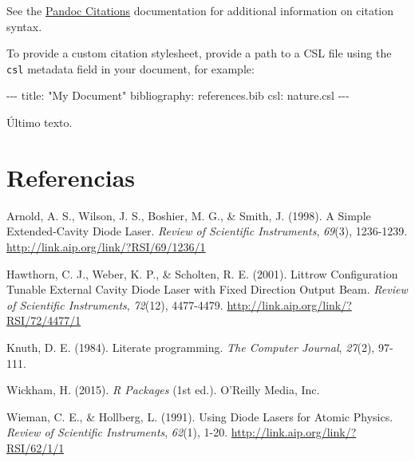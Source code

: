 \documentclass[
  letterpaper,
  12pt,
  oneside,
  spanish,
  doublespacing,
  headsepline,
  parskip]{MastersDoctoralThesis}
\newenvironment{Shaded}{\begin{snugshade}}{\end{snugshade}}
\newcommand{\AttributeTok}[1]{\textcolor[rgb]{0.40,0.45,0.13}{#1}}
\newcommand{\FunctionTok}[1]{\textcolor[rgb]{0.28,0.35,0.67}{#1}}
\newcommand{\KeywordTok}[1]{\textcolor[rgb]{0.00,0.23,0.31}{#1}}
\newcommand{\PreprocessorTok}[1]{\textcolor[rgb]{0.68,0.00,0.00}{#1}}
\newcommand{\StringTok}[1]{\textcolor[rgb]{0.13,0.47,0.30}{#1}}
\newlength{\cslhangindent}
\newlength{\cslentryspacingunit} %
\newenvironment{CSLReferences}[2] %
 {%
  \setlength{\parindent}{0pt}
  \ifodd #1
  \let\oldpar\par
  \def\par{\hangindent=\cslhangindent\oldpar}
  \fi
  \setlength{\parskip}{#2\cslentryspacingunit}
 }%
 {}
\begin{document}
See the \href{https://pandoc.org/MANUAL.html\#citations}{Pandoc
Citations} documentation for additional information on citation syntax.

To provide a custom citation stylesheet, provide a path to a CSL file
using the \texttt{csl} metadata field in your document, for example:

\begin{Shaded}
\begin{Highlighting}[]
\PreprocessorTok{{-}{-}{-}}
\FunctionTok{title}\KeywordTok{:}\AttributeTok{ }\StringTok{"My Document"}
\FunctionTok{bibliography}\KeywordTok{:}\AttributeTok{ references.bib}
\FunctionTok{csl}\KeywordTok{:}\AttributeTok{ nature.csl}
\PreprocessorTok{{-}{-}{-}}
\end{Highlighting}
\end{Shaded}

\newpage{}

Último texto.


\hypertarget{referencias}{%
\chapter*{Referencias}\label{referencias}}

\hypertarget{refs}{}
\begin{CSLReferences}{1}{0}
\leavevmode{}%
Arnold, A. S., Wilson, J. S., Boshier, M. G., \& Smith, J. (1998). A
Simple Extended-Cavity Diode Laser. \emph{Review of Scientific
Instruments}, \emph{69}(3), 1236-1239.
\url{http://link.aip.org/link/?RSI/69/1236/1}

\leavevmode{}%
Hawthorn, C. J., Weber, K. P., \& Scholten, R. E. (2001). Littrow
Configuration Tunable External Cavity Diode Laser with Fixed Direction
Output Beam. \emph{Review of Scientific Instruments}, \emph{72}(12),
4477-4479. \url{http://link.aip.org/link/?RSI/72/4477/1}

\leavevmode{}%
Knuth, D. E. (1984). Literate programming. \emph{The Computer Journal},
\emph{27}(2), 97-111.

\leavevmode{}%
Wickham, H. (2015). \emph{R Packages} (1st ed.). O'Reilly Media, Inc.

\leavevmode{}%
Wieman, C. E., \& Hollberg, L. (1991). Using Diode Lasers for Atomic
Physics. \emph{Review of Scientific Instruments}, \emph{62}(1), 1-20.
\url{http://link.aip.org/link/?RSI/62/1/1}

\end{CSLReferences}
\end{document}

